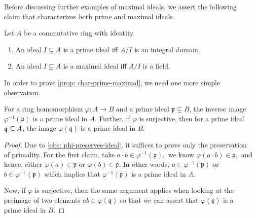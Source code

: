 Before discussing further examples of maximal ideals, we assert the following claim that characterizes both prime and maximal ideals.
\begin{proposition}\label{prop: char-prime-maximal}
    Let $A$ be a commutative ring with identity.
    \begin{enumerate}
        \item \label{item: char-prime}  An ideal $I \subsetneq A$ is a prime ideal iff $A / I$ is an integral domain.
        \item \label{item: char-maximal} An ideal $I \subsetneq A$ is a maximal ideal iff $A / I$ is a field. 
    \end{enumerate}
\end{proposition}
In order to prove \cref{prop: char-prime-maximal}, we need one more simple observation.
\begin{observation}\label{obs: phi-preserves-prime}
    For a ring homomorphism $\varphi: A \rightarrow B$ and a prime ideal $\mathfrak{p} \subsetneq B$, 
    the inverse image $\varphi^{-1}(\mathfrak{p})$ is a prime ideal in $A$. Further, if $\varphi$ is surjective, then for a prime ideal $\mathfrak{q} \ss A$, the image $\varphi(\mathfrak{q})$ is a prime ideal in $B$.
\end{observation}
\begin{proof}
    Due to \cref{obs: phi-preserves-ideal}, it suffices to prove only the preservation of primality. For the first claim, take $a\cdot b \in \varphi^{-1}(\mathfrak{p}),$ we know $\varphi(a\cdot b) \in \mathfrak{p},$ and hence, either $\varphi(a) \in \mathfrak{p}$ or $\varphi(b) \in \mathfrak{p}.$ In other words, $a \in \varphi^{-1}(\mathfrak{p})$ or $b \in \varphi^{-1}(\mathfrak{p})$ which implies that $\varphi^{-1}(\mathfrak{p})$ is a prime ideal in $A$.

    Now, if $\varphi$ is surjective, then the same argument applies when looking at the preimage of two elements $ab \in \varphi(\mathfrak{q})$ so that we can assert that $\varphi(\mathfrak{q})$ is a prime ideal in $B$.
\end{proof}
